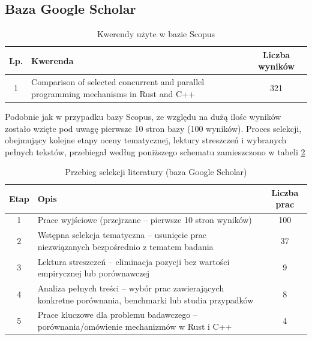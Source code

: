 \subsection{Baza Google Scholar}
\begin{table}[H]
    \caption{Kwerendy użyte w bazie Scopus \protect \footnotemark}
    \label{table:literatureReviewQueries}
    \begin{tabular}{|c|p{11cm}|c|}
    \hline
    Lp. & Kwerenda & Liczba wyników \\ \hline
    1 & Comparison of selected concurrent and parallel programming mechanisms in Rust and C++ & 321 \\ \hline

    \end{tabular}
\end{table}
Podobnie jak w przypadku bazy Scopus, ze względu na dużą ilośc wyników zostało wzięte pod uwagę pierwsze 10 stron bazy (100 wyników). Proces selekcji, obejmujący kolejne etapy oceny tematycznej, lektury streszczeń i wybranych pełnych tekstów, przebiegał według poniższego schematu zamieszczono w tabeli \ref{table:selectionProcessGoogle}
\begin{table}[H]
    \caption{Przebieg selekcji literatury (baza Google Scholar)} 
    \label{table:selectionProcessGoogle}
    \begin{tabular}{|c|p{11.5cm}|c|}
    \hline
    Etap & Opis & Liczba prac  \\ \hline 
    1 & Prace wyjściowe (przejrzane – pierwsze 10 stron wyników) & 100 \\ \hline 
    2 & Wstępna selekcja tematyczna – usunięcie prac niezwiązanych bezpośrednio z tematem badania & 37 \\ \hline 
    3 & Lektura streszczeń – eliminacja pozycji bez wartości empirycznej lub porównawczej & 9 \\ \hline 
    4 & Analiza pełnych treści – wybór prac zawierających konkretne porównania, benchmarki lub studia przypadków & 8 \\ \hline 
    5 & Prace kluczowe dla problemu badawczego – porównania/omówienie mechanizmów w Rust i C++ & 4 \\ \hline 
    \end{tabular} 
\end{table}

